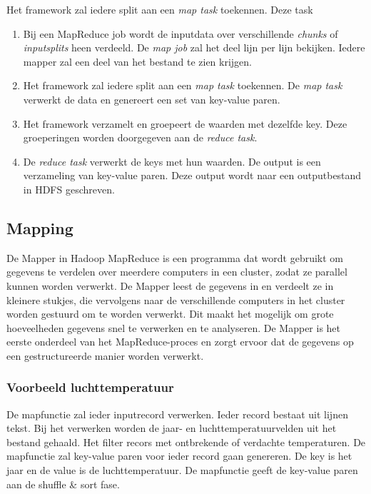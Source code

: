 \documentclass[a4paper,10pt,twoside]{report}
\begin{document}
 Het framework zal iedere split aan een \textit{map task} toekennen. Deze task

\begin{enumerate}
	\item Bij een MapReduce job wordt de inputdata over verschillende \textit{chunks} of \textit{inputsplits} heen verdeeld. De \textit{map job} zal het deel lijn per lijn bekijken. Iedere mapper zal een deel van het bestand te zien krijgen.
	\item Het framework zal iedere split aan een \textit{map task} toekennen. De \textit{map task} verwerkt de data en genereert een set van key-value paren.
	\item Het framework verzamelt en groepeert de waarden met dezelfde key. Deze groeperingen worden doorgegeven aan de \textit{reduce task}.
	\item De \textit{reduce task} verwerkt de keys met hun waarden. De output is een verzameling van key-value paren. Deze output wordt naar een outputbestand in HDFS geschreven.
\end{enumerate}

\subsection{Mapping}

De Mapper in Hadoop MapReduce is een programma dat wordt gebruikt om gegevens te verdelen over meerdere computers in een cluster, zodat ze parallel kunnen worden verwerkt. De Mapper leest de gegevens in en verdeelt ze in kleinere stukjes, die vervolgens naar de verschillende computers in het cluster worden gestuurd om te worden verwerkt. Dit maakt het mogelijk om grote hoeveelheden gegevens snel te verwerken en te analyseren. De Mapper is het eerste onderdeel van het MapReduce-proces en zorgt ervoor dat de gegevens op een gestructureerde manier worden verwerkt.

\subsubsection{Voorbeeld luchttemperatuur}

De mapfunctie zal ieder inputrecord verwerken. Ieder record bestaat uit lijnen tekst. Bij het verwerken worden de jaar- en luchttemperatuurvelden uit het bestand gehaald. Het filter recors met ontbrekende of verdachte temperaturen. De mapfunctie zal key-value paren voor ieder record gaan genereren. De key is het jaar en de value is de luchttemperatuur. De mapfunctie geeft de key-value paren aan de shuffle \& sort fase.
\end{document}
